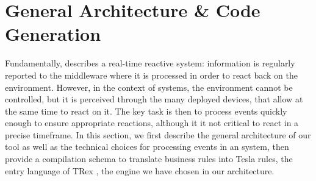 \section{General Architecture \& Code Generation}
\label{sec:CG}

Fundamentally, \IOTDSL describes a real-time reactive system: information is regularly reported to the middleware where it is processed in order to react back on the environment. However, in the context of \IOT systems, the environment cannot be controlled, but it is perceived through the many deployed devices, that allow at the same time to react on it. The key task is then to process events quickly enough to ensure appropriate reactions, although it it not critical to react in a precise timeframe. In this section, we first describe the general architecture of our tool as well as the technical choices for processing events in an \IOT system, then provide a compilation schema to translate \IOTDSL business rules into Tesla rules, the entry language of TRex \cite{cugola-12}, the \CEP engine we have chosen in our architecture.



